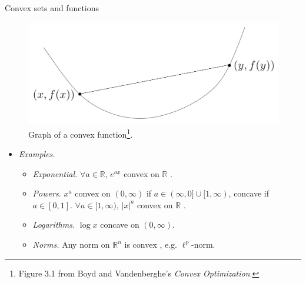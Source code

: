 \documentclass{beamer}
\numberwithin{equation}{section}
\begin{document}
\begin{frame}{Convex sets and functions}
    \begin{figure}
        \centering
        \includegraphics[scale = 0.25]{bv_fig_3.1.png}
        \vspace{-10 pt}
        \caption{Graph of a convex function\footnote{
            Figure 3.1 from Boyd and Vandenberghe's
            \textit{Convex Optimization}.
        }. }
        \vspace{-15 pt}
    \end{figure}
    \begin{itemize}
        \item
        \textit{Examples.}
        \begin{itemize}
            \item
            \textit{Exponential.} $ \forall a \in \mathbb{R} $, $ e^{ax} $
            convex on $ \mathbb{R} $ \cite{bv_convex_opt}.

            \item
            \textit{Powers.} $ x^a $ convex on $ (0, \infty) $ if
            $ a \in (\infty, 0] \cup [1, \infty) $, concave if
            $ a \in [0, 1] $. $ \forall a \in [1, \infty) $, $ |x|^a $ convex
            on $ \mathbb{R} $ \cite{bv_convex_opt}.

            \item
            \textit{Logarithms.} $ \log x $ concave on $ (0, \infty) $.

            \item
            \textit{Norms.} Any norm on $ \mathbb{R}^n $ is convex
            \cite{bv_convex_opt}, e.g. $ \ell^p $-norm.
        \end{itemize}
    \end{itemize}
\end{frame}
\end{document}
